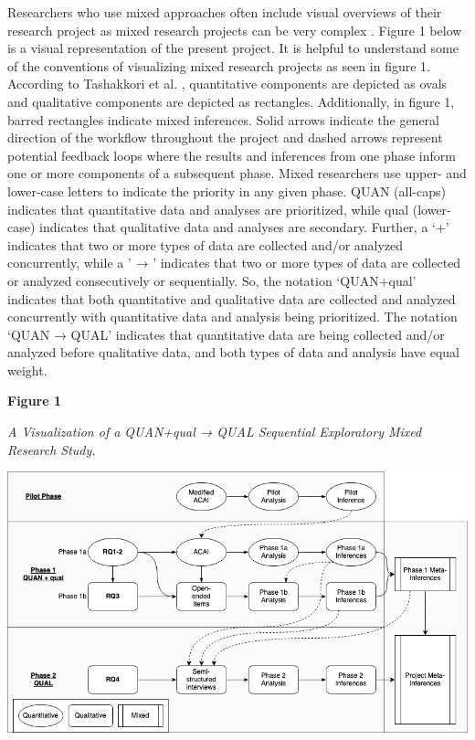 \documentclass[
]{book}
\begin{document}
Researchers who use mixed approaches often include visual overviews of their research project as mixed research projects can be very complex \citep{creamerIntroductionFullyIntegrated2018}. Figure 1 below is a visual representation of the present project. It is helpful to understand some of the conventions of visualizing mixed research projects as seen in figure 1. According to Tashakkori et al. \citeyearpar{tashakkoriFoundationsMixedMethods2020}, quantitative components are depicted as ovals and qualitative components are depicted as rectangles. Additionally, in figure 1, barred rectangles indicate mixed inferences. Solid arrows indicate the general direction of the workflow throughout the project and dashed arrows represent potential feedback loops where the results and inferences from one phase inform one or more components of a subsequent phase. Mixed researchers use upper- and lower-case letters to indicate the priority in any given phase. QUAN (all-caps) indicates that quantitative data and analyses are prioritized, while qual (lower-case) indicates that qualitative data and analyses are secondary. Further, a `+' indicates that two or more types of data are collected and/or analyzed concurrently, while a ' → ' indicates that two or more types of data are collected or analyzed consecutively or sequentially. So, the notation `QUAN+qual' indicates that both quantitative and qualitative data are collected and analyzed concurrently with quantitative data and analysis being prioritized. The notation `QUAN → QUAL' indicates that quantitative data are being collected and/or analyzed before qualitative data, and both types of data and analysis have equal weight.

\textbf{Figure 1}

\emph{A Visualization of a QUAN+qual → QUAL Sequential Exploratory Mixed Research Study.}

\includegraphics{images/methods-viz.png}
\end{document}
